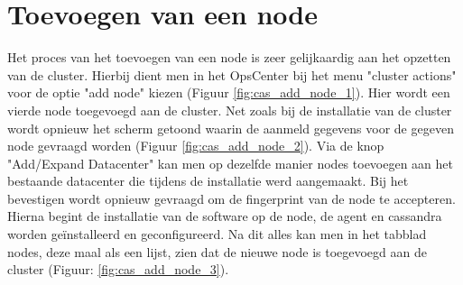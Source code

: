 \section{Toevoegen van een node}
Het proces van het toevoegen van een node is zeer gelijkaardig aan het opzetten van de cluster.
Hierbij dient men in het OpsCenter bij het menu "cluster actions" voor de optie "add node" kiezen (Figuur \ref{fig:cas_add_node_1}).
Hier wordt een vierde node toegevoegd aan de cluster.
Net zoals bij de installatie van de cluster wordt opnieuw het scherm getoond waarin de aanmeld gegevens voor de gegeven node gevraagd worden (Figuur \ref{fig:cas_add_node_2}).
Via de knop "Add/Expand Datacenter" kan men op dezelfde manier nodes toevoegen aan het bestaande datacenter die tijdens de installatie werd aangemaakt.
Bij het bevestigen wordt opnieuw gevraagd om de fingerprint van de node te accepteren.
Hierna begint de installatie van de software op de node, de agent en cassandra worden geïnstalleerd en geconfigureerd.
Na dit alles kan men in het tabblad nodes, deze maal als een lijst, zien dat de nieuwe node is toegevoegd aan de cluster (Figuur: \ref{fig:cas_add_node_3}).

